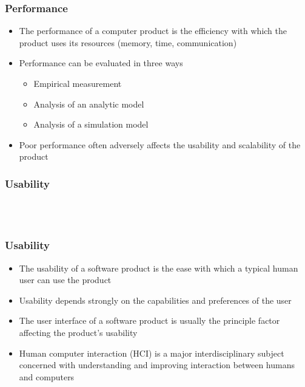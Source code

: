 \documentclass[t,12pt,numbers,fleqn]{beamer}
\begin{document}
\begin{frame}
\frametitle{Performance}

\begin{itemize}
\item The performance of a computer product is the efficiency with which the
  product uses its resources (memory, time, communication)
\item Performance can be evaluated in three ways
\begin{itemize}
\item Empirical measurement
\item Analysis of an analytic model
\item Analysis of a simulation model
\end{itemize}
\item Poor performance often adversely affects the usability and scalability of
  the product
\end{itemize}

\end{frame}


\begin{frame}
\frametitle{Usability}

\\
~\\

\end{frame}


\begin{frame}
\frametitle{Usability}

\begin{itemize}
\item The usability of a software product is the ease with which a typical human
  user can use the product
\item Usability depends strongly on the capabilities and preferences of the user
\item The user interface of a software product is usually the principle factor
  affecting the product's usability
\item Human computer interaction (HCI) is a major interdisciplinary subject
  concerned with understanding and improving interaction between humans and
  computers
\end{itemize}
\end{frame}
\end{document}
